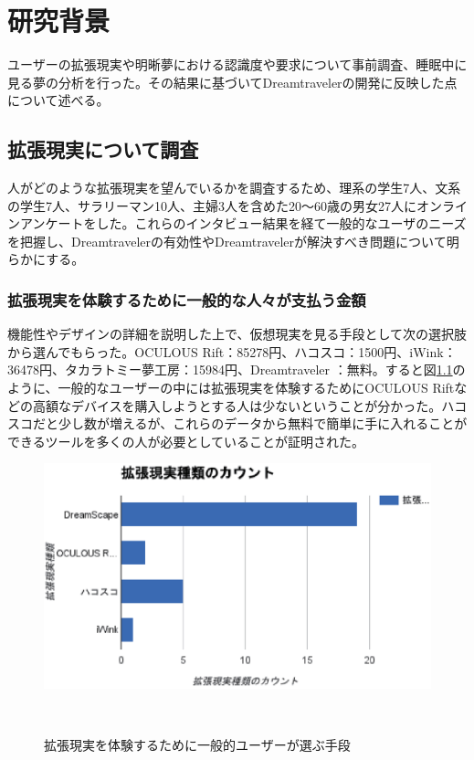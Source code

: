 \chapter{研究背景}
\label{chap:webapi}

ユーザーの拡張現実や明晰夢における認識度や要求について事前調査、睡眠中に見る夢の分析を行った。その結果に基づいてDreamtravelerの開発に反映した点について述べる。

\section{拡張現実について調査}
人がどのような拡張現実を望んでいるかを調査するため、理系の学生7人、文系の学生7人、サラリーマン10人、主婦3人を含めた20〜60歳の男女27人にオンラインアンケートをした。これらのインタビュー結果を経て一般的なユーザのニーズを把握し、Dreamtravelerの有効性やDreamtravelerが解決すべき問題について明らかにする。

\subsection{拡張現実を体験するために一般的な人々が支払う金額}
機能性やデザインの詳細を説明した上で、仮想現実を見る手段として次の選択肢から選んでもらった。OCULOUS Rift：85278円、ハコスコ：1500円、iWink：36478円、タカラトミー夢工房：15984円、Dreamtraveler ：無料。すると図\ref{userNeedCost}のように、一般的なユーザーの中には拡張現実を体験するためにOCULOUS Riftなどの高額なデバイスを購入しようとする人は少ないということが分かった。ハコスコだと少し数が増えるが、これらのデータから無料で簡単に手に入れることができるツールを多くの人が必要としていることが証明された。

\begin{figure}[htbp]
\begin{center}
\includegraphics[width=15cm]{eps/VRselection.eps}
\caption{拡張現実を体験するために一般的ユーザーが選ぶ手段}
　\label{userNeedCost}
\end{center}
\end{figure}

